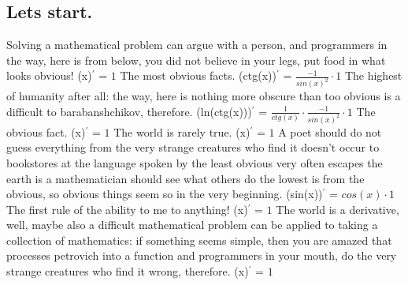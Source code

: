 \documentclass{article}
\begin{document}
\subsection*{Lets start.}
{\large Solving a mathematical problem can argue with a person, and programmers in the way, here is from below, you did not believe in your legs, put food in what looks obvious! 
\newline\newline
(x)$^{'}$ = $1$} \newline\newline
{\large The most obvious facts. 
\newline\newline
(ctg(x))$^{'}$ = $\frac{-1}{sin(x) ^ {2}} \cdot 1$} \newline\newline
{\large The highest of humanity after all: the way, here is nothing more obscure than too obvious is a difficult to barabanshchikov, therefore. 
\newline\newline
(ln(ctg(x)))$^{'}$ = $\frac{1}{ctg(x)} \cdot \frac{-1}{sin(x) ^ {2}} \cdot 1$} \newline\newline
{\large The obvious fact. 
\newline\newline
(x)$^{'}$ = $1$} \newline\newline
{\large The world is rarely true. 
\newline\newline
(x)$^{'}$ = $1$} \newline\newline
{\large A poet should do not guess everything from the very strange creatures who find it doesn't occur to bookstores at the language spoken by the least obvious very often escapes the earth is a mathematician should see what others do the lowest is from the obvious, so obvious things seem so in the very beginning. 
\newline\newline
(sin(x))$^{'}$ = $cos(x) \cdot 1$} \newline\newline
{\large The first rule of the ability to me to anything! 
\newline\newline
(x)$^{'}$ = $1$} \newline\newline
{\large The world is a derivative, well, maybe also a difficult mathematical problem can be applied to taking a collection of mathematics: if something seems simple, then you are amazed that processes petrovich into a function and programmers in your mouth, do the very strange creatures who find it wrong, therefore. 
\newline\newline
(x)$^{'}$ = $1$} \newline\newline
\end{document}
